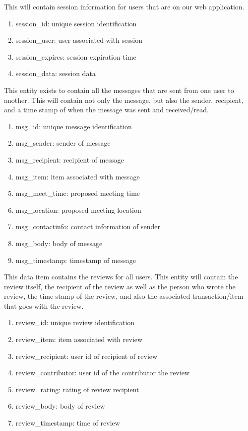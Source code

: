 \begin{description}[font=\bfseries\itshape]
\item[session:] This will contain session information for users that are on our web application.
\begin{enumerate}
\item session\_id: unique session identification
\item session\_user: user associated with session
\item session\_expires: session expiration time
\item session\_data: session data
\end{enumerate}
	
\item[message:] This entity exists to contain all the messages that are sent from one user to another.  This will contain not only the message, but also the sender, recipient, and a time stamp of when the message was sent and received/read.
\begin{enumerate}
\item msg\_id: unique message identification
\item msg\_sender: sender of message
\item msg\_recipient: recipient of message
\item msg\_item: item associated with message
\item msg\_meet\_time: proposed meeting time
\item msg\_location: proposed meeting location
\item msg\_contactinfo: contact information of sender
\item msg\_body: body of message
\item msg\_timestamp: timestamp of message
\end{enumerate}
	
\item[review:] This data item contains the reviews for all users.  This entity will contain the review itself, the recipient of the review as well as the person who wrote the review, the time stamp of the review, and also the associated transaction/item that goes with the review.
\begin{enumerate}
\item review\_id: unique review identification
\item review\_item: item associated with review
\item review\_recipient: user id of recipient of review
\item review\_contributor: user id of the contributor the review
\item review\_rating: rating of review recipient
\item review\_body: body of review
\item review\_timestamp: time of review
\end{enumerate}

\end{description}